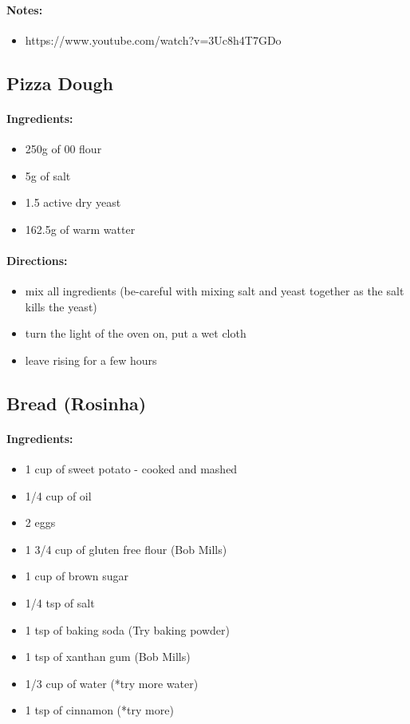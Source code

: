 \documentclass{article}
\begin{document}
\paragraph{Notes:}
\begin{itemize}
    \item https://www.youtube.com/watch?v=3Uc8h4T7GDo
\end{itemize}

\subsection{Pizza Dough}

\paragraph{Ingredients:}
\begin{itemize}
    \item 250g of 00 flour
    \item 5g of salt
    \item 1.5 active dry yeast
    \item 162.5g of warm watter
\end{itemize}

\paragraph{Directions:}
\begin{itemize}
    \item mix all ingredients (be-careful with mixing salt and yeast together as the salt kills the yeast)
    \item turn the light of the oven on, put a wet cloth
    \item leave rising for a few hours
\end{itemize}

\subsection{Bread (Rosinha)}

\paragraph{Ingredients:}
\begin{itemize}
    \item 1 cup of sweet potato - cooked and mashed
    \item 1/4 cup of oil
    \item 2 eggs
    \item 1 3/4 cup of gluten free flour (Bob Mills)
    \item 1 cup of brown sugar
    \item 1/4 tsp of salt
    \item 1 tsp of baking soda (Try baking powder)
    \item 1 tsp of xanthan gum (Bob Mills)
    \item 1/3 cup of water (*try more water)
    \item 1 tsp of cinnamon (*try more)
\end{itemize}
\end{document}
